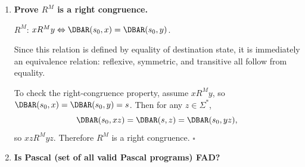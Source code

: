 \begin{enumerate}[{2.}1.]
\begin{enumerate}
\item $\mathbf{ab}$ is not related to $\mathbf{bb}$: take $z=\mathbf{b}$. Then
\[
\mathbf{ab}z=\mathbf{abb}\notin\Gamma
\]
because among length-3 strings only $\mathbf{bbb}$ is in $\Gamma$.
But
\[
\mathbf{bb}z=\mathbf{bbb}\in\Gamma.
\]
So $\mathbf{ab}\not R_\Gamma \mathbf{bb}$. $\square$

\item The 8 classes are exactly:
\[
C_0=\{\lambda\},\ C_1=\{\mathbf a\},\ C_2=\{\mathbf b\},\ C_3=\{\mathbf{aa}\},\ C_4=\{\mathbf{bb}\},
\]
\[
C_5=\{\mathbf{ab},\mathbf{ba}\},\ C_6=\{x:|x|=3,\ x\neq \mathbf{bbb}\},\ C_7=\{\mathbf{bbb}\}\cup\{x:|x|\ge4\}.
\]
These are pairwise distinct by suitable suffixes (for instance, $C_4$ vs $C_5$ by suffix $\mathbf b$:
$\mathbf{bb}\mathbf b=\mathbf{bbb}\in\Gamma$ but $\mathbf{ab}\mathbf b=\mathbf{abb}\notin\Gamma$).

\item Minimal DFA has these 8 states, start $C_0$, final states
\[
F=\{C_0,C_1,C_4,C_5,C_7\}.
\]
Transition function:
\[
\delta(C_0,\mathbf a)=C_1,\ \delta(C_0,\mathbf b)=C_2,
\]
\[
\delta(C_1,\mathbf a)=C_3,\ \delta(C_1,\mathbf b)=C_5,
\]
\[
\delta(C_2,\mathbf a)=C_5,\ \delta(C_2,\mathbf b)=C_4,
\]
\[
\delta(C_3,\mathbf a)=C_6,\ \delta(C_3,\mathbf b)=C_6,
\]
\[
\delta(C_4,\mathbf a)=C_6,\ \delta(C_4,\mathbf b)=C_7,
\]
\[
\delta(C_5,\mathbf a)=C_6,\ \delta(C_5,\mathbf b)=C_6,
\]
\[
\delta(C_6,\mathbf a)=C_7,\ \delta(C_6,\mathbf b)=C_7,\ \delta(C_7,\mathbf a)=C_7,\ \delta(C_7,\mathbf b)=C_7.
\]
\end{enumerate}

\item \textbf{Prove $R^M$ is a right congruence.}

$R^M$: $x R^M y\Leftrightarrow\DBAR(s_0,x)=\DBAR(s_0,y)$.

Since this relation is defined by equality of destination state, it is immediately an equivalence relation: reflexive, symmetric, and transitive all follow from equality.

To check the right-congruence property, assume $x R^M y$, so $\DBAR(s_0,x)=\DBAR(s_0,y)=s$. Then for any $z\in\Sigma^*$,
\[
\DBAR(s_0,xz)=\DBAR(s,z)=\DBAR(s_0,yz),
\]
so $xz R^M yz$. Therefore $R^M$ is a right congruence. $\square$

\item \textbf{Is Pascal (set of all valid Pascal programs) FAD?}


\end{enumerate}

